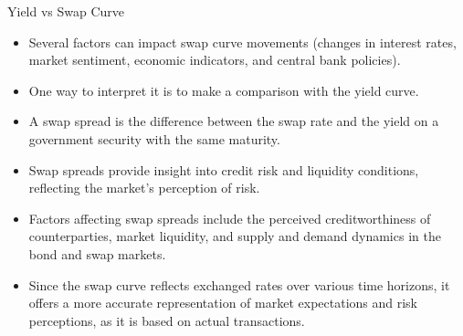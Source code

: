 \documentclass{beamer}
\begin{document}
\begin{frame}{Yield vs Swap Curve} 
\begin{itemize}
\item Several factors can impact swap curve movements (changes in interest rates, market sentiment, economic indicators, and central bank policies).
\item One way to interpret it is to make a comparison with the yield curve.
\item A swap spread is the difference between the swap rate and the yield on a government security with the same maturity. 
\item Swap spreads provide insight into credit risk and liquidity conditions, reflecting the market's perception of risk. 
\item Factors affecting swap spreads include the perceived creditworthiness of counterparties, market liquidity, and supply and demand dynamics in the bond and swap markets. 
\item Since the swap curve reflects exchanged rates over various time horizons, it offers a more accurate representation of market expectations and risk perceptions, as it is based on actual transactions.
\end{itemize}
\end{frame}
\end{document}

